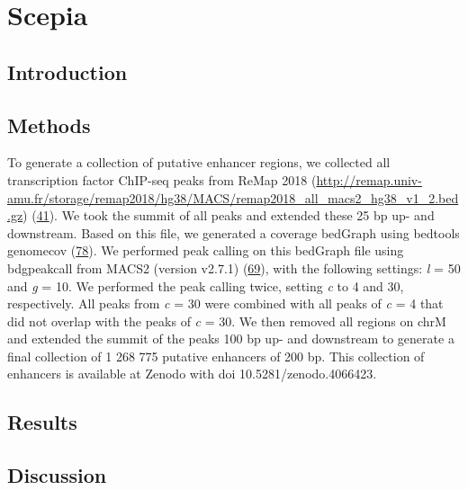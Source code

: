 \chapter{Scepia}\thumbforchapter
{}
\newpage

\section{Introduction}

\section{Methods}

To generate a collection of putative enhancer regions, we collected all transcription factor ChIP-seq peaks from ReMap 2018 (\href{http://remap.univ-amu.fr/storage/remap2018/hg38/MACS/remap2018_all_macs2_hg38_v1_2.bed.gz}{http://remap.univ-amu.fr/storage/remap2018/hg38/MACS/remap2018\_all\_macs2\_hg38\_v1\_2.bed.gz}) (\href{javascript:;}{41}). We took the summit of all peaks and extended these 25 bp up- and downstream. Based on this file, we generated a coverage bedGraph using bedtools genomecov (\href{javascript:;}{78}). We performed peak calling on this bedGraph file using bdgpeakcall from MACS2 (version v2.7.1) (\href{javascript:;}{69}), with the following settings: \textit{l} = 50 and \textit{g} = 10. We performed the peak calling twice, setting \textit{c} to 4 and 30, respectively. All peaks from \textit{c} = 30 were combined with all peaks of \textit{c} = 4 that did not overlap with the peaks of \textit{c} = 30. We then removed all regions on chrM and extended the summit of the peaks 100 bp up- and downstream to generate a final collection of 1 268 775 putative enhancers of 200 bp. This collection of enhancers is available at Zenodo with doi 10.5281/zenodo.4066423.

\section{Results}

\cite{}

\section{Discussion}
